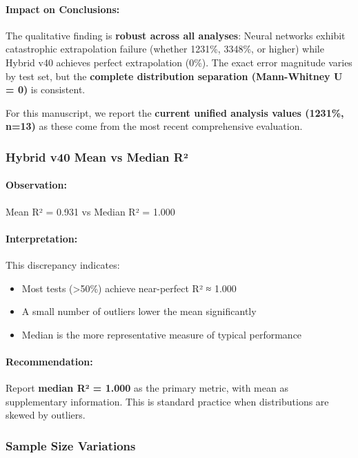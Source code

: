 \paragraph{Impact on Conclusions:}

The qualitative finding is \textbf{robust across all analyses}: Neural networks exhibit catastrophic extrapolation failure (whether 1231\%, 3348\%, or higher) while Hybrid v40 achieves perfect extrapolation (0\%). The exact error magnitude varies by test set, but the \textbf{complete distribution separation (Mann-Whitney U = 0)} is consistent.

For this manuscript, we report the \textbf{current unified analysis values (1231\%, n=13)} as these come from the most recent comprehensive evaluation.

\subsubsection{Hybrid v40 Mean vs Median R²}

\paragraph{Observation:} Mean R² = 0.931 vs Median R² = 1.000

\paragraph{Interpretation:}

This discrepancy indicates:
\begin{itemize}
    \item Most tests (>50\%) achieve near-perfect R² ≈ 1.000
    \item A small number of outliers lower the mean significantly
    \item Median is the more representative measure of typical performance
\end{itemize}

\paragraph{Recommendation:} Report \textbf{median R² = 1.000} as the primary metric, with mean as supplementary information. This is standard practice when distributions are skewed by outliers.

\subsubsection{Sample Size Variations}

